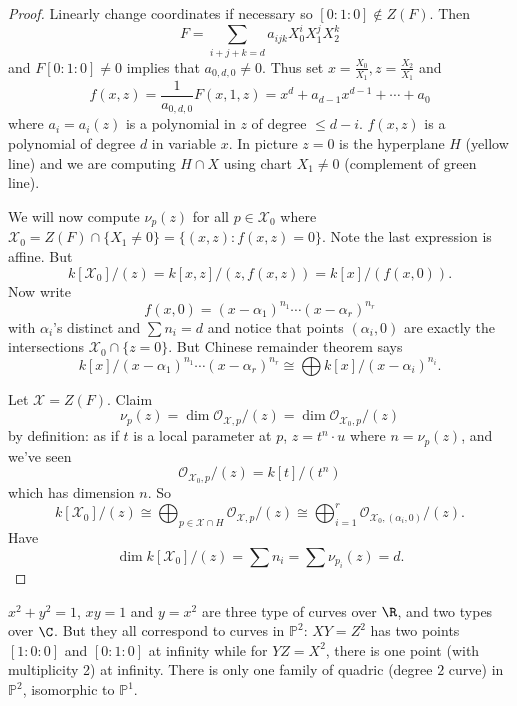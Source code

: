 \documentclass[a4paper]{article}
\renewcommand*{\P}{\mathbb{P}}
\begin{document}
\begin{proof}
  Linearly change coordinates if necessary so \([0: 1 : 0] \notin Z(F)\). Then
  \[
    F = \sum_{i + j + k = d} a_{ijk} X_0^i X_1^j X_2^k
  \]
  and \(F[0: 1: 0] \neq 0\) implies that \(a_{0, d, 0} \neq 0\). Thus set \(x = \frac{X_0}{X_1}, z = \frac{X_2}{X_1}\) and
  \[
    f(x, z) = \frac{1}{a_{0, d, 0}} F(x, 1, z)
    = x^d + a_{d - 1} x^{d - 1} + \cdots + a_0
  \]
  where \(a_i = a_i(z)\) is a polynomial in \(z\) of degree \(\leq d - i\). \(f(x, z)\) is a polynomial of degree \(d\) in variable \(x\). In picture \(z = 0\) is the hyperplane \(H\) (yellow line) and we are computing \(H \cap X\) using chart \(X_1 \neq 0\) (complement of green line).

  We will now compute \(\nu_p(z)\) for all \(p \in \mathcal X_0\) where \(\mathcal X_0 = Z(F) \cap \{X_1 \neq 0 \} = \{(x, z): f(x, z) = 0\}\). Note the last expression is affine. But
  \[
    k[\mathcal X_0]/(z)
    = k[x, z]/(z, f(x, z))
    = k[x]/(f(x, 0)).
  \]
  Now write
  \[
    f(x, 0) = (x - \alpha_1)^{n_1} \cdots (x - \alpha_r)^{n_r}
  \]
  with \(\alpha_i\)'s distinct and \(\sum n_i = d\) and notice that points \((\alpha_i, 0)\) are exactly the intersections \(\mathcal X_0 \cap \{z = 0\}\). But Chinese remainder theorem says
  \[
    k[x]/(x - \alpha_1)^{n_1} \cdots (x - \alpha_r)^{n_r} \cong \bigoplus k[x]/(x - \alpha_i)^{n_i}.
  \]

   Let \(\mathcal X = Z(F)\). Claim
  \[
    \nu_p(z) = \dim \mathcal O_{\mathcal X, p}/(z) = \dim \mathcal O_{\mathcal X_0, p} /(z)
  \]
  by definition: as if \(t\) is a local parameter at \(p\), \(z = t^n \cdot u\) where \(n = \nu_p(z)\), and we've seen
  \[
    \mathcal O_{\mathcal X_0, p}/(z) = k[t]/(t^n)
  \]
  which has dimension \(n\). So
  \[
    k[\mathcal X_0]/(z) \cong \bigoplus_{p \in \mathcal X \cap H} \mathcal O_{\mathcal X, p}/(z) \cong \bigoplus_{i = 1}^r \mathcal O_{\mathcal X_0, (\alpha_i, 0)} /(z).
  \]
  Have
  \[
    \dim k[\mathcal X_0]/(z) = \sum n_i = \sum \nu_{p_i}(z) = d.
  \]
\end{proof}

\begin{remark}[quadrics]
  \(x^2 + y^2 = 1\), \(xy = 1\) and \(y = x^2\) are three type of curves over \(\R\), and two types over \(\C\). But they all correspond to curves in \(\P^2\): \(XY = Z^2\) has two points \([1:0:0]\) and \([0:1:0]\) at infinity while for \(YZ = X^2\), there is one point (with multiplicity 2) at infinity. There is only one family of quadric (degree \(2\) curve) in \(\P^2\), isomorphic to \(\P^1\).
\end{remark}
\end{document}

